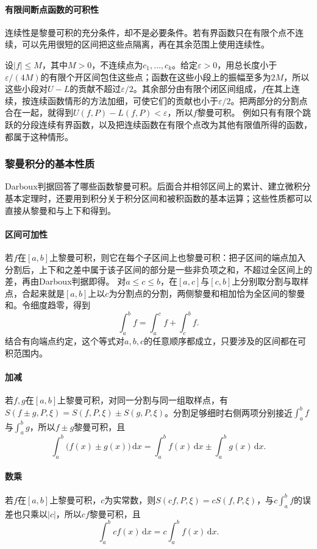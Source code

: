 \paragraph{有限间断点函数的可积性}
连续性是黎曼可积的充分条件，却不是必要条件。若有界函数只在有限个点不连续，可以先用很短的区间把这些点隔离，再在其余范围上使用连续性。

设$|f|\leq M$，其中$M>0$，不连续点为$c_1,\ldots,c_k$。给定$\varepsilon>0$，用总长度小于$\varepsilon/(4M)$的有限个开区间包住这些点；函数在这些小段上的振幅至多为$2M$，所以这些小段对$U-L$的贡献不超过$\varepsilon/2$。其余部分由有限个闭区间组成，$f$在其上连续，按连续函数情形的方法加细，可使它们的贡献也小于$\varepsilon/2$。把两部分的分割点合在一起，就得到$U(f,P)-L(f,P)<\varepsilon$，所以$f$黎曼可积。
例如只有有限个跳跃的分段连续有界函数，以及把连续函数在有限个点改为其他有限值所得的函数，都属于这种情形。

\subsubsection{黎曼积分的基本性质}

Darboux判据回答了哪些函数黎曼可积。后面合并相邻区间上的累计、建立微积分基本定理时，还要用到积分关于积分区间和被积函数的基本运算；这些性质都可以直接从黎曼和与上下和得到。

\paragraph{区间可加性}
若$f$在$[a,b]$上黎曼可积，则它在每个子区间上也黎曼可积：把子区间的端点加入分割后，上下和之差中属于该子区间的部分是一些非负项之和，不超过全区间上的差，再由Darboux判据即得。
对$a\leq c\leq b$，在$[a,c]$与$[c,b]$上分别取分割与取样点，合起来就是$[a,b]$上以$c$为分割点的分割，两侧黎曼和相加恰为全区间的黎曼和。令细度趋零，得到
\[
 \int_a^bf=\int_a^cf+\int_c^bf.
\]
结合有向端点约定，这个等式对$a,b,c$的任意顺序都成立，只要涉及的区间都在可积范围内。

\paragraph{加减}
若$f,g$在$[a,b]$上黎曼可积，对同一分割与同一组取样点，有$S(f\pm g,P,\xi)=S(f,P,\xi)\pm S(g,P,\xi)$。分割足够细时右侧两项分别接近$\int_a^bf$与$\int_a^bg$，所以$f\pm g$黎曼可积，且
\[
 \int_a^b\bigl(f(x)\pm g(x)\bigr)\,\mathrm dx=\int_a^bf(x)\,\mathrm dx\pm\int_a^bg(x)\,\mathrm dx.
\]

\paragraph{数乘}
若$f$在$[a,b]$上黎曼可积，$c$为实常数，则$S(cf,P,\xi)=cS(f,P,\xi)$，与$c\int_a^bf$的误差也只乘以$|c|$，所以$cf$黎曼可积，且
\[
 \int_a^bcf(x)\,\mathrm dx=c\int_a^bf(x)\,\mathrm dx.
\]

